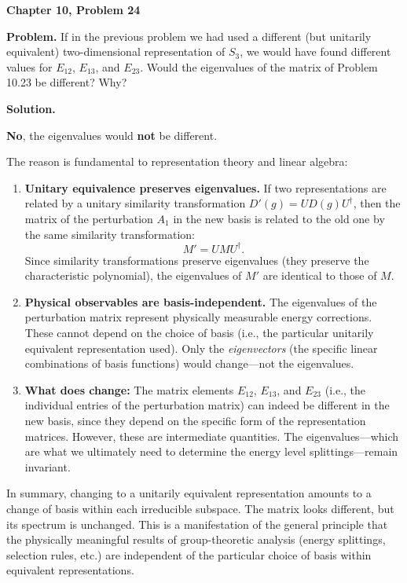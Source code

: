 \documentclass[12pt]{article}
\begin{document}
\begin{center}
{\Large\bfseries Chapter 10, Problem 24}
\end{center}

\noindent\textbf{Problem.} If in the previous problem we had used a different (but unitarily equivalent) two-dimensional representation of $S_3$, we would have found different values for $E_{12}$, $E_{13}$, and $E_{23}$. Would the eigenvalues of the matrix of Problem 10.23 be different? Why?

\bigskip
\noindent\textbf{Solution.}

\textbf{No}, the eigenvalues would \textbf{not} be different.

The reason is fundamental to representation theory and linear algebra:

\begin{enumerate}
\item \textbf{Unitary equivalence preserves eigenvalues.} If two representations are related by a unitary similarity transformation $D'(g) = U D(g) U^\dagger$, then the matrix of the perturbation $A_1$ in the new basis is related to the old one by the same similarity transformation:
\[
M' = U M U^\dagger.
\]
Since similarity transformations preserve eigenvalues (they preserve the characteristic polynomial), the eigenvalues of $M'$ are identical to those of $M$.

\item \textbf{Physical observables are basis-independent.} The eigenvalues of the perturbation matrix represent physically measurable energy corrections. These cannot depend on the choice of basis (i.e., the particular unitarily equivalent representation used). Only the \textit{eigenvectors} (the specific linear combinations of basis functions) would change---not the eigenvalues.

\item \textbf{What does change:} The matrix elements $E_{12}$, $E_{13}$, and $E_{23}$ (i.e., the individual entries of the perturbation matrix) can indeed be different in the new basis, since they depend on the specific form of the representation matrices. However, these are intermediate quantities. The eigenvalues---which are what we ultimately need to determine the energy level splittings---remain invariant.
\end{enumerate}

In summary, changing to a unitarily equivalent representation amounts to a change of basis within each irreducible subspace. The matrix looks different, but its spectrum is unchanged. This is a manifestation of the general principle that the physically meaningful results of group-theoretic analysis (energy splittings, selection rules, etc.) are independent of the particular choice of basis within equivalent representations.
\end{document}

